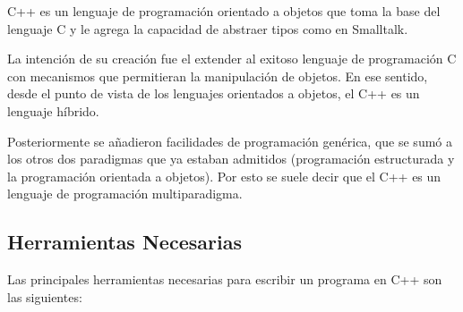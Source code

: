 C++ es un lenguaje de programación orientado a objetos que toma la base del lenguaje C y le agrega la capacidad de abstraer tipos como en Smalltalk.

La intención de su creación fue el extender al exitoso lenguaje de programación C con mecanismos que permitieran la manipulación de objetos. En ese sentido, desde el punto de vista de los lenguajes orientados a objetos, el C++ es un lenguaje híbrido.

Posteriormente se añadieron facilidades de programación genérica, que se sumó a los otros dos paradigmas que ya estaban admitidos (programación estructurada y la programación orientada a objetos). Por esto se suele decir que el C++ es un lenguaje de programación multiparadigma.

\subsection{Herramientas Necesarias}

Las principales herramientas necesarias para escribir un programa en C++ son las siguientes:

